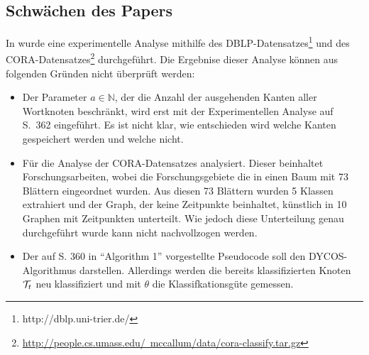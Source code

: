 \subsection{Schwächen des Papers}
In \cite{aggarwal2011} wurde eine experimentelle Analyse mithilfe 
des DBLP-Datensatzes\footnote{http://dblp.uni-trier.de/} und des
CORA-Datensatzes\footnote{\href{http://people.cs.umass.edu/~mccallum/data/cora-classify.tar.gz}{http://people.cs.umass.edu/~mccallum/data/cora-classify.tar.gz}} durchgeführt.
Die Ergebnise dieser Analyse können aus folgenden Gründen
nicht überprüft werden:
\begin{itemize}
    \item Der Parameter $a \in \mathbb{N}$, der die Anzahl der ausgehenden Kanten
          aller Wortknoten beschränkt, wird erst mit der Experimentellen
          Analyse auf S.~362 eingeführt.
          Es ist nicht klar, wie entschieden wird welche Kanten
          gespeichert werden und welche nicht.
    \item Für die Analyse der CORA-Datensatzes analysiert.
          Dieser beinhaltet Forschungsarbeiten, wobei die 
          Forschungsgebiete die in einen Baum mit 73 Blättern 
          eingeordnet wurden. Aus diesen 73 Blättern wurden 5 Klassen
          extrahiert und der Graph, der keine Zeitpunkte beinhaltet,
          künstlich in 10 Graphen mit Zeitpunkten unterteilt. Wie
          jedoch diese Unterteilung genau durchgeführt wurde kann nicht
          nachvollzogen werden.
    \item Der auf S. 360 in \enquote{Algorithm 1} vorgestellte
          Pseudocode soll den DYCOS-Algorithmus darstellen. Allerdings
          werden die bereits klassifizierten Knoten $\mathcal{T}_t$ neu klassifiziert
          und mit $\theta$ die Klassifkationsgüte gemessen.
\end{itemize}
